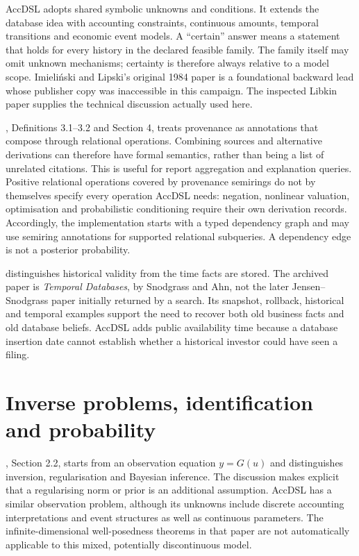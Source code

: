 AccDSL adopts shared symbolic unknowns and conditions. It extends the database
idea with accounting constraints, continuous amounts, temporal transitions and
economic event models. A ``certain'' answer means a statement that holds for
every history in the declared feasible family. The family itself may omit
unknown mechanisms; certainty is therefore always relative to a model scope.
Imieliński and Lipski's original 1984 paper is a foundational backward lead
whose publisher copy was inaccessible in this campaign. The inspected Libkin
paper supplies the technical discussion actually used here.

\citet{green2007}, Definitions 3.1--3.2 and Section 4, treats provenance as
annotations that compose through relational operations. Combining sources
and alternative derivations can therefore have formal semantics, rather than
being a list of unrelated citations. This is useful for report aggregation and
explanation queries. Positive relational operations covered by provenance
semirings do not by themselves specify every operation AccDSL needs: negation,
nonlinear valuation, optimisation and probabilistic conditioning require their
own derivation records. Accordingly, the implementation starts with a typed
dependency graph and may use semiring annotations for supported relational
subqueries. A dependency edge is not a posterior probability.

\citet{snodgrass1986} distinguishes historical validity from the time facts
are stored. The archived paper is \emph{Temporal Databases}, by Snodgrass and
Ahn, not the later Jensen--Snodgrass paper initially returned by a search.
Its snapshot, rollback, historical and temporal examples support the need to
recover both old business facts and old database beliefs. AccDSL adds public
availability time because a database insertion date cannot establish whether
a historical investor could have seen a filing.

\section{Inverse problems, identification and probability}

\citet{stuart2010}, Section 2.2, starts from an observation equation
$y=G(u)$ and distinguishes inversion, regularisation and Bayesian inference.
The discussion makes explicit that a regularising norm or prior is an
additional assumption. AccDSL has a similar observation problem, although
its unknowns include discrete accounting interpretations and event structures
as well as continuous parameters. The infinite-dimensional well-posedness
theorems in that paper are not automatically applicable to this mixed,
potentially discontinuous model.

